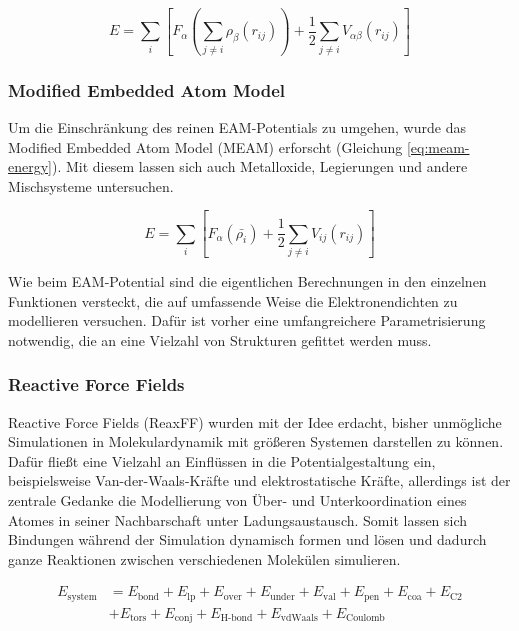 \begin{equation}
  \label{eq:eam-energy}
  E = \sum_i\left[F_\alpha\left(\sum_{j\neq i}{\rho_\beta\left(r_{ij}\right)}\right) + \frac{1}{2}\sum_{j\neq i}{V_{\alpha\beta}\left(r_{ij}\right)}\right]
\end{equation}

\subsubsection{Modified Embedded Atom Model}

Um die Einschränkung des reinen EAM-Potentials zu umgehen, wurde das Modified Embedded Atom Model (MEAM) erforscht (Gleichung \ref{eq:meam-energy}). 
Mit diesem lassen sich auch Metalloxide, Legierungen und andere Mischsysteme untersuchen.


\begin{equation}
  \label{eq:meam-energy}
  E = \sum_i\left[F_\alpha\left(\bar{\rho_i}\right) + \frac{1}{2}\sum_{j\neq i}{V_{ij}\left(r_{ij}\right)}\right]
\end{equation}

Wie beim EAM-Potential sind die eigentlichen Berechnungen in den einzelnen Funktionen versteckt, die auf umfassende Weise die Elektronendichten zu modellieren versuchen.
Dafür ist vorher eine umfangreichere Parametrisierung notwendig, die an eine Vielzahl von Strukturen gefittet werden muss.

\subsubsection{Reactive Force Fields}

Reactive Force Fields (ReaxFF) wurden mit der Idee erdacht, bisher unmögliche Simulationen in Molekulardynamik mit größeren Systemen darstellen zu können.
Dafür fließt eine Vielzahl an Einflüssen in die Potentialgestaltung ein, beispielsweise Van-der-Waals-Kräfte und elektrostatische Kräfte, allerdings ist der zentrale Gedanke die Modellierung von Über- und Unterkoordination eines Atomes in seiner Nachbarschaft unter Ladungsaustausch.
Somit lassen sich Bindungen während der Simulation dynamisch formen und lösen und dadurch ganze Reaktionen zwischen verschiedenen Molekülen simulieren.

\begin{align}
  \label{eq:reax-formulation}
  E_\text{system} &= E_\text{bond} + E_\text{lp} + E_\text{over} + E_\text{under} + E_\text{val} + E_\text{pen} + E_\text{coa} + E_\text{C2} \\
\nonumber  & + E_\text{tors} + E_\text{conj} + E_\text{H-bond} + E_\text{vdWaals} + E_\text{Coulomb}
\end{align}

